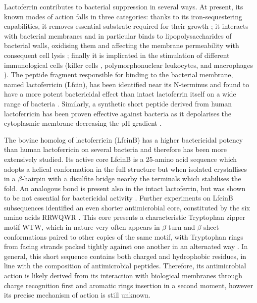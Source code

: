 Lactoferrin contributes to bacterial suppression in several ways. At present, its known modes of action falls in three categories: thanks to its iron-sequestering capabilities, it removes essential substrate required for their growth \cite{Arnaud2003}; it interacts with bacterial membranes and in particular binds to lipopolysaccharides of bacterial walls, oxidising them and affecting the membrane permeability with consequent cell lysis \cite{Arnaus2003}; finally it is implicated in the stimulation of different immunological cells (killer cells \cite{Shau1992}, polymorphonuclear leukocytes, and macrophages \cite{Gahr1991}).
The peptide fragment responsible for binding to the bacterial membrane, named lactoferricin (Lfcin), has been identified near its N-terminus and found to have a more potent bactericidal effect than intact lactoferrin itself on a wide range of bacteria \cite{Gifford2005,Wayne1992,Tomita1994,Wakabayashi1996}.
%
Similarly, a synthetic short peptide derived from human lactoferricin has been proven effective against bacteria as it depolarises the cytoplasmic membrane decreasing the pH gradient \cite{Aguilera1999}.

The bovine homolog of lactoferricin (LfcinB) has a higher bactericidal potency than human lactoferricin on several bacteria \cite{Cochran2001} and therefore has been more extensively studied. Its active core LfcinB is a 25-amino acid sequence which adopts a helical conformation in the full structure but when isolated crystallises in a $\beta$-hairpin with a disulfite bridge nearby the terminals which stabilises the fold. An analogous bond is present also in the intact lactoferrin, but was shown to be not essential for bactericidal activity \cite{Cochran2001}.
%
Further experiments on LfcinB subsequences identified an even shorter antimicrobial core, constituted by the six amino acids RRWQWR \cite{Schibli1999}. This core presents a characteristic Tryptophan zipper motif WTW, which in nature very often appears in $\beta$-turn and $\beta$-sheet conformations paired to other copies of the same motif, with Tryptophan rings from facing strands packed tightly against one another in an alternated way \cite{Cochran2001}.
In general, this short sequence contains both charged and hydrophobic residues, in line with the composition of antimicrobial peptides. Therefore, its antimicrobial action is likely derived from its interaction with biological membranes through charge recognition first and aromatic rings insertion in a second moment, however its precise mechanism of action is still unknown.

